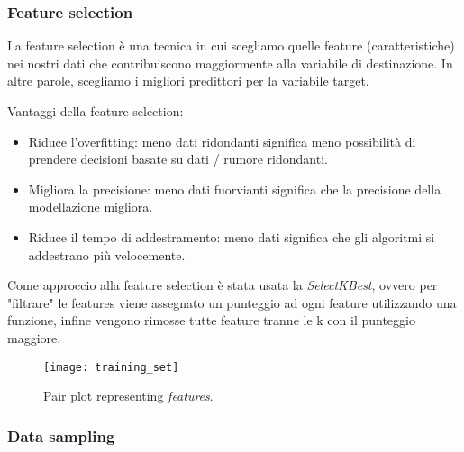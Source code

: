         
                
                \subsubsection{Feature selection}
                
		                La feature selection è una tecnica in cui scegliamo quelle feature (caratteristiche) nei nostri dati che contribuiscono maggiormente alla variabile di destinazione. In altre parole, scegliamo i migliori predittori per la variabile target.
		                
		                Vantaggi della feature selection:
		                
		                \begin{itemize}
		                	\item Riduce l'overfitting: meno dati ridondanti significa meno possibilità di prendere decisioni basate su dati / rumore ridondanti.
		                	\item Migliora la precisione: meno dati fuorvianti significa che la precisione della modellazione migliora.
		                	\item Riduce il tempo di addestramento: meno dati significa che gli algoritmi si addestrano più velocemente.	              
		                \end{itemize}
		                
                        Come approccio alla feature selection è stata usata la \textit{SelectKBest}, ovvero
                        per "filtrare" le features viene assegnato un punteggio ad ogni feature utilizzando una funzione, infine vengono rimosse tutte feature tranne le k con il punteggio maggiore.\\
                   
                     
                        
                        \begin{figure}[!h]
                            \centering
                            \texttt{[image: training\_set]}
                            \caption{Pair plot representing \textit{features}.}
                            \label{fig:training_set_pairplot}
                        \end{figure}
                        \clearpage
                
                \subsubsection{Data sampling} 
                
